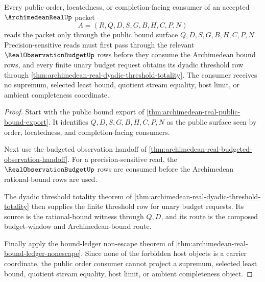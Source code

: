 \begin{theorem}
\label{thm:archimedean-real-public-order-consumer}
Every public order, locatedness, or completion-facing consumer of an accepted $\ArchimedeanRealUp$ packet
$$
A=(R,Q,D,S,G,B,H,C,P,N)
$$
reads the packet only through the public bound surface $Q,D,S,G,B,H,C,P,N$. Precision-sensitive reads must first pass through the relevant $\RealObservationBudgetUp$ rows before they consume the Archimedean bound rows, and every finite unary budget request obtains its dyadic threshold row through \autoref{thm:archimedean-real-dyadic-threshold-totality}. The consumer receives no supremum, selected least bound, quotient stream equality, host limit, or ambient completeness coordinate.
\end{theorem}
\begin{proof}
Start with the public bound export of \autoref{thm:archimedean-real-public-bound-export}. It identifies $Q,D,S,G,B,H,C,P,N$ as the public surface seen by order, locatedness, and completion-facing consumers.

Next use the budgeted observation handoff of \autoref{thm:archimedean-real-budgeted-observation-handoff}. For a precision-sensitive read, the $\RealObservationBudgetUp$ rows are consumed before the Archimedean rational-bound rows are used.

The dyadic threshold totality theorem of \autoref{thm:archimedean-real-dyadic-threshold-totality} then supplies the finite threshold row for unary budget requests. Its source is the rational-bound witness through $Q,D$, and its route is the composed budget-window and Archimedean-bound route.

Finally apply the bound-ledger non-escape theorem of \autoref{thm:archimedean-real-bound-ledger-nonescape}. Since none of the forbidden host objects is a carrier coordinate, the public order consumer cannot project a supremum, selected least bound, quotient stream equality, host limit, or ambient completeness object.
\end{proof}

